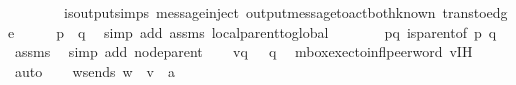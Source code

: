 \begin{isabellebody}
\ \ \ \ \ \ \ \ is{\isacharunderscore}{\kern0pt}output{\isachardot}{\kern0pt}simps{\isacharparenleft}{\kern0pt}{}{\isacharparenright}{\kern0pt}\ message{\isachardot}{\kern0pt}inject\ output{\isacharunderscore}{\kern0pt}message{\isacharunderscore}{\kern0pt}to{\isacharunderscore}{\kern0pt}act{\isacharunderscore}{\kern0pt}both{\isacharunderscore}{\kern0pt}known\ trans{\isacharunderscore}{\kern0pt}to{\isacharunderscore}{\kern0pt}edge{\isacharparenright}{\kern0pt}\isanewline
\ \ \isamarkupfalse%
\ \isamarkupfalse%
\ {\isachardoublequoteopen}{\isasymG}{\isasymlangle}{\isasymrightarrow}p{\isasymrangle}\ {\isacharequal}{\kern0pt}\ {\isacharbraceleft}{\kern0pt}q{\isacharbraceright}{\kern0pt}{\isachardoublequoteclose}\ \isamarkupfalse%
\ {\isacharparenleft}{\kern0pt}simp\ add{\isacharcolon}{\kern0pt}\ assms{\isacharparenleft}{\kern0pt}{}{\isacharparenright}{\kern0pt}\ local{\isacharunderscore}{\kern0pt}parent{\isacharunderscore}{\kern0pt}to{\isacharunderscore}{\kern0pt}global{\isacharparenright}{\kern0pt}\ \ \isanewline
\ \ \isamarkupfalse%
\ \isamarkupfalse%
\ pq{\isacharcolon}{\kern0pt}\ {\isachardoublequoteopen}is{\isacharunderscore}{\kern0pt}parent{\isacharunderscore}{\kern0pt}of\ p\ q{\isachardoublequoteclose}\ \isamarkupfalse%
\ assms\ \isamarkupfalse%
\ {\isacharparenleft}{\kern0pt}simp\ add{\isacharcolon}{\kern0pt}\ node{\isacharunderscore}{\kern0pt}parent{\isacharparenright}{\kern0pt}\isanewline
\ \ \isamarkupfalse%
\ {\isachardoublequoteopen}{\isacharparenleft}{\kern0pt}{\isacharquery}{\kern0pt}v{\isacharprime}{\kern0pt}{\isacharparenright}{\kern0pt}{\isasymdown}\isactrlsub q\ {\isasymin}\ {\isasymL}\isactrlsup {\isacharasterisk}{\kern0pt}\ q{\isachardoublequoteclose}\ \isamarkupfalse%
\ mbox{\isacharunderscore}{\kern0pt}exec{\isacharunderscore}{\kern0pt}to{\isacharunderscore}{\kern0pt}infl{\isacharunderscore}{\kern0pt}peer{\isacharunderscore}{\kern0pt}word\ v{\isacharunderscore}{\kern0pt}IH\ \isamarkupfalse%
\ auto\isanewline
\ \ \isamarkupfalse%
\ w{\isacharunderscore}{\kern0pt}sends{\isacharunderscore}{\kern0pt}{}{\isacharcolon}{\kern0pt}\ {\isachardoublequoteopen}w\ {\isacharequal}{\kern0pt}\ {\isacharparenleft}{\kern0pt}{\isacharparenleft}{\kern0pt}{\isacharquery}{\kern0pt}v{\isacharprime}{\kern0pt}{\isacharparenright}{\kern0pt}\ {\isasymsqdot}\ {\isacharbrackleft}{\kern0pt}a{\isacharbrackright}{\kern0pt}{\isacharparenright}{\kern0pt}{\isasymdown}\isactrlsub {\isacharbang}{\kern0pt}{\isachardoublequoteclose}\ \isamarkupfalse%

\end{isabellebody}
